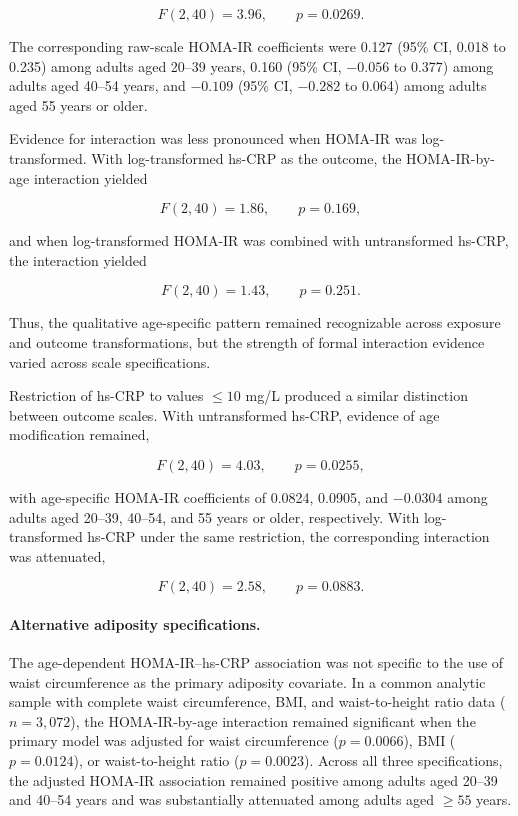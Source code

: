 \documentclass[11pt]{article}
\begin{document}
\[
F(2,40)=3.96,
\qquad
p=0.0269.
\]

The corresponding raw-scale HOMA-IR coefficients were 0.127
(95\% CI, 0.018 to 0.235) among adults aged 20--39 years,
0.160 (95\% CI, $-0.056$ to 0.377) among adults aged
40--54 years, and $-0.109$ (95\% CI, $-0.282$ to 0.064)
among adults aged 55 years or older.

Evidence for interaction was less pronounced when HOMA-IR was
log-transformed. With log-transformed hs-CRP as the outcome, the
HOMA-IR-by-age interaction yielded

\[
F(2,40)=1.86,
\qquad
p=0.169,
\]

and when log-transformed HOMA-IR was combined with untransformed
hs-CRP, the interaction yielded

\[
F(2,40)=1.43,
\qquad
p=0.251.
\]

Thus, the qualitative age-specific pattern remained recognizable
across exposure and outcome transformations, but the strength of
formal interaction evidence varied across scale specifications.

Restriction of hs-CRP to values $\leq10$ mg/L produced a similar
distinction between outcome scales. With untransformed hs-CRP,
evidence of age modification remained,

\[
F(2,40)=4.03,
\qquad
p=0.0255,
\]

with age-specific HOMA-IR coefficients of 0.0824, 0.0905, and
$-0.0304$ among adults aged 20--39, 40--54, and 55 years or older,
respectively. With log-transformed hs-CRP under the same restriction,
the corresponding interaction was attenuated,

\[
F(2,40)=2.58,
\qquad
p=0.0883.
\]

\paragraph{Alternative adiposity specifications.}
The age-dependent HOMA-IR--hs-CRP association was not specific to the use
of waist circumference as the primary adiposity covariate. In a common
analytic sample with complete waist circumference, BMI, and
waist-to-height ratio data ($n=3{,}072$), the HOMA-IR-by-age interaction
remained significant when the primary model was adjusted for waist
circumference ($p=0.0066$), BMI ($p=0.0124$), or waist-to-height ratio
($p=0.0023$). Across all three specifications, the adjusted HOMA-IR
association remained positive among adults aged 20--39 and 40--54 years
and was substantially attenuated among adults aged $\geq55$ years.
\end{document}
